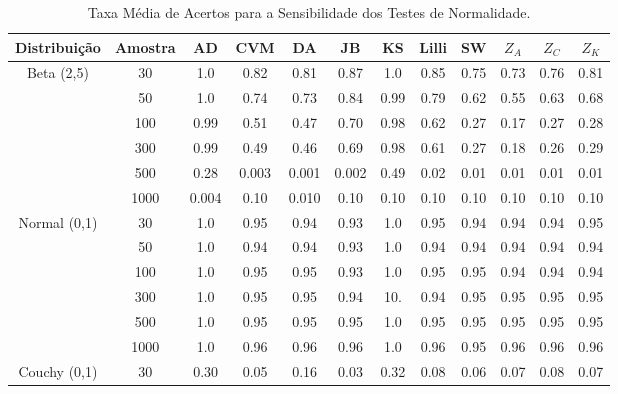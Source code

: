 \documentclass[a4paper,11pt]{article} %
\begin{document}
\begin{table}[H]
    \centering
    \caption{Taxa Média de Acertos para a Sensibilidade dos Testes de Normalidade.}
    \begin{tabular}{c|c|c|c|c|c|c|c|c|c|c|c}
    \hline \hline
Distribuição              & Amostra &   AD  & CVM  &  DA   & JB   &  KS   & Lilli &  SW  & $Z_{A}$ & $Z_{C}$ & $Z_{K}$ \\
    \hline
\multirow{6}{*}{Beta (2,5)} 
                          & 30      & 1.0   & 0.82 & 0.81  & 0.87 &  1.0  &  0.85  &  0.75 &  0.73  & 0.76   & 0.81   \\
                          & 50      & 1.0   & 0.74 & 0.73  & 0.84 &  0.99 &  0.79  &  0.62 &  0.55  & 0.63   & 0.68   \\
                          & 100     & 0.99  & 0.51 & 0.47  & 0.70 &  0.98 &  0.62  &  0.27 &  0.17  & 0.27   & 0.28   \\
                          & 300     & 0.99  & 0.49 & 0.46  & 0.69 &  0.98 &  0.61  &  0.27 &  0.18  & 0.26   & 0.29    \\
                          & 500     & 0.28  & 0.003 & 0.001  & 0.002 & 0.49  & 0.02 & 0.01  & 0.01  & 0.01   & 0.01     \\
                          & 1000    & 0.004 & 0.10  & 0.010  & 0.10 & 0.10  & 0.10  & 0.10  & 0.10  & 0.10  & 0.10       \\
                          \hline\hline
\multirow{6}{*}{Normal (0,1)}   
                          & 30      & 1.0  & 0.95  & 0.94 & 0.93 &  1.0 & 0.95  & 0.94  &  0.94  &  0.94  & 0.95   \\
                          &  50     & 1.0  & 0.94  & 0.94 & 0.93 &  1.0 & 0.94  & 0.94  &  0.94  &  0.94  & 0.94    \\
                          & 100     & 1.0  & 0.95  & 0.95 & 0.93 &  1.0 & 0.95  & 0.95  &  0.94  &  0.94  & 0.94    \\
                          & 300     & 1.0  & 0.95  & 0.95 & 0.94 &  10. & 0.94  & 0.95  &  0.95  &  0.95  & 0.95     \\
                         & 500    & 1.0   & 0.95  &  0.95 & 0.95 &  1.0  &  0.95  & 0.95  &  0.95  &  0.95  & 0.95    \\
               & 1000   & 1.0   & 0.96  &  0.96 & 0.96 &  1.0  &  0.96  & 0.95  &  0.96  &  0.96  & 0.96     \\ 
                          \hline\hline
\multirow{6}{*}{Couchy (0,1)}     
                         & 30     &  0.30 & 0.05  &  0.16 & 0.03 & 0.32  & 0.08  & 0.06  & 0.07   & 0.08   & 0.07    \\

\end{tabular}
\end{table}
\end{document}
